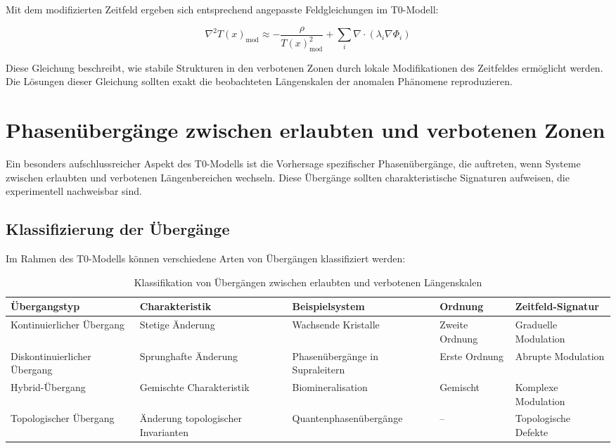 \documentclass[12pt,a4paper]{article}
\newcommand{\Tfield}{T(x)}
\begin{document}
	Mit dem modifizierten Zeitfeld ergeben sich entsprechend angepasste Feldgleichungen im T0-Modell:
	
	\begin{equation}
		\nabla^2\Tfield_{\text{mod}} \approx -\frac{\rho}{\Tfield_{\text{mod}}^2} + \sum_i \nabla \cdot \left( \lambda_i \nabla \Phi_i \right)
	\end{equation}
	
	Diese Gleichung beschreibt, wie stabile Strukturen in den verbotenen Zonen durch lokale Modifikationen des Zeitfeldes ermöglicht werden. Die Lösungen dieser Gleichung sollten exakt die beobachteten Längenskalen der anomalen Phänomene reproduzieren.
	
	\section{Phasenübergänge zwischen erlaubten und verbotenen Zonen}
	
	Ein besonders aufschlussreicher Aspekt des T0-Modells ist die Vorhersage spezifischer Phasenübergänge, die auftreten, wenn Systeme zwischen erlaubten und verbotenen Längenbereichen wechseln. Diese Übergänge sollten charakteristische Signaturen aufweisen, die experimentell nachweisbar sind.
	
	\subsection{Klassifizierung der Übergänge}
	
	Im Rahmen des T0-Modells können verschiedene Arten von Übergängen klassifiziert werden:
	
	\begin{table}[h]
		\centering
		\begin{adjustbox}{scale=0.6}
			\begin{tabular}{lllll}
				\hline
				\textbf{Übergangstyp} & \textbf{Charakteristik} & \textbf{Beispielsystem} & \textbf{Ordnung} & \textbf{Zeitfeld-Signatur} \\
				\hline
				Kontinuierlicher Übergang & Stetige Änderung & Wachsende Kristalle & Zweite Ordnung & Graduelle Modulation \\
				Diskontinuierlicher Übergang & Sprunghafte Änderung & Phasenübergänge in Supraleitern & Erste Ordnung & Abrupte Modulation \\
				Hybrid-Übergang & Gemischte Charakteristik & Biomineralisation & Gemischt & Komplexe Modulation \\
				Topologischer Übergang & Änderung topologischer Invarianten & Quantenphasenübergänge & – & Topologische Defekte \\
				\hline
			\end{tabular}
		\end{adjustbox}
		\caption{Klassifikation von Übergängen zwischen erlaubten und verbotenen Längenskalen}
		\label{tab:transitions}
	\end{table}
	
\end{document}
